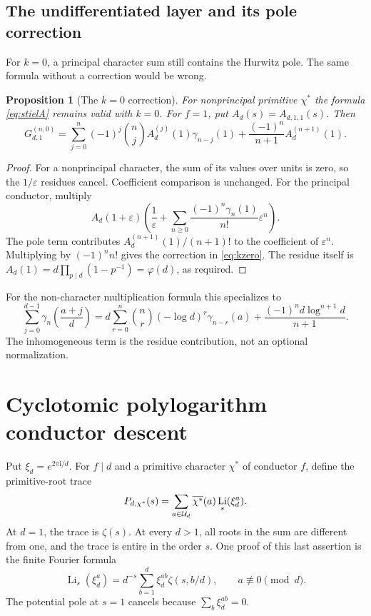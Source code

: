 \documentclass[11pt]{article}
\numberwithin{equation}{section}
\newtheorem{proposition}[theorem]{Proposition}
\theoremstyle{definition}\newtheorem{definition}[theorem]{Definition}
\theoremstyle{remark}\newtheorem{remark}[theorem]{Remark}
\DeclareMathOperator{\Li}{Li}
\newcommand{\ii}{\mathrm i}
\newcommand{\eps}{\varepsilon}
\newcommand{\ch}{\chi^*}
\newcommand{\bch}{\overline{\chi^*}}
\begin{document}
\subsection{The undifferentiated layer and its pole correction}

For $k=0$, a principal character sum still contains the Hurwitz pole.
The same formula without a correction would be wrong.

\begin{proposition}[The $k=0$ correction]\label{prop:kzero}
For nonprincipal primitive $\ch$ the formula
\eqref{eq:stielA} remains valid with $k=0$. For $f=1$, put
$A_d(s)=A_{d,1,1}(s)$. Then
\begin{equation}\label{eq:kzero}
G_{d,1}^{(n,0)}=
\sum_{j=0}^{n}(-1)^j\binom nj A_d^{(j)}(1)\gamma_{n-j}(1)
+\frac{(-1)^n}{n+1}A_d^{(n+1)}(1).
\end{equation}
\end{proposition}
\begin{proof}
For a nonprincipal character, the sum of its values over units is zero,
so the $1/\eps$ residues cancel. Coefficient comparison is unchanged.
For the principal conductor, multiply
\[
A_d(1+\eps)\left(\frac1\eps+
\sum_{n\ge0}\frac{(-1)^n\gamma_n(1)}{n!}\eps^n\right).
\]
The pole term contributes $A_d^{(n+1)}(1)/(n+1)!$ to the coefficient of
$\eps^n$. Multiplying by $(-1)^n n!$ gives the correction in
\eqref{eq:kzero}. The residue itself is
$A_d(1)=d\prod_{p\mid d}(1-p^{-1})=\varphi(d)$, as required.
\end{proof}

For the non-character multiplication formula this specializes to
\begin{equation}\label{eq:classicalstieldist}
\sum_{j=0}^{d-1}\gamma_n\!\left(\frac{a+j}{d}\right)
=d\sum_{r=0}^{n}\binom nr(-\log d)^r\gamma_{n-r}(a)
+\frac{(-1)^n d\log^{n+1}d}{n+1}.
\end{equation}
The inhomogeneous term is the residue contribution, not an optional
normalization.

\section{Cyclotomic polylogarithm conductor descent}

Put $\xi_d=e^{2\pi\ii/d}$. For $f\mid d$ and a primitive character
$\ch$ of conductor $f$, define the primitive-root trace
\begin{equation}\label{eq:Pdef}
P_{d,\ch}(s)=\sum_{a\in\U_d}\bch(a)\Li_s(\xi_d^a).
\end{equation}
At $d=1$, the trace is $\zeta(s)$. At every $d>1$, all roots in the sum
are different from one, and the trace is entire in the order $s$.
One proof of this last assertion is the finite Fourier formula
\begin{equation}\label{eq:fourierzeta}
\Li_s(\xi_d^a)=d^{-s}\sum_{b=1}^{d}\xi_d^{ab}\zeta(s,b/d),
\qquad a\not\equiv0\pmod d.
\end{equation}
The potential pole at $s=1$ cancels because $\sum_b\xi_d^{ab}=0$.
\end{document}
